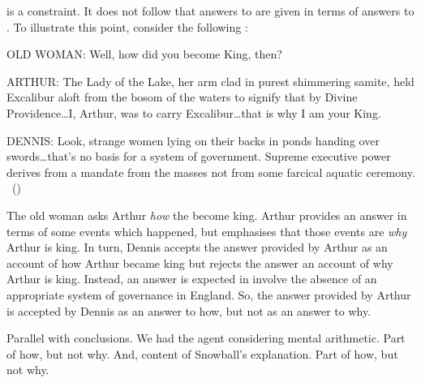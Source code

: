 \begin{note}
  \issueInclusion{} is a constraint.
  It does not follow that answers to \qWhy{} are given in terms of answers to \qHow{}.
  To illustrate this point, consider the following \scen{}:

  \begin{scenario}[England AD 932]
    \vspace{-\baselineskip}
    \begin{screenplay}
    \item[OLD WOMAN:]
      Well, how did you become King, then?
    \item[ARTHUR:]
      The Lady of the Lake, her arm clad in purest shimmering samite, held Excalibur aloft from the bosom of the waters to signify that by Divine Providence\space\dots\space I, Arthur, was to carry Excalibur\dots\space that is why I am your King.
    \item[DENNIS:]
      Look, strange women lying on their backs in ponds handing over swords\space\dots\space that's no basis for a system of government.
      Supreme executive power derives from a mandate from the masses not from some farcical aquatic ceremony.%
      \mbox{ }\hfill\mbox{(\cite[8--9]{Cleese:1974aa})}
    \end{screenplay}
    \vspace{-\baselineskip}
  \end{scenario}

  The old woman asks Arthur \emph{how} the become king.
  Arthur provides an answer in terms of some events which happened, but emphasises that those events are \emph{why} Arthur is king.
  In turn, Dennis accepts the answer provided by Arthur as an account of how Arthur became king but rejects the answer an account of why Arthur is king.
  Instead, an answer is expected in involve the absence of an appropriate system of governance in England.
  So, the answer provided by Arthur is accepted by Dennis as an answer to how, but not as an answer to why.
\end{note}

\begin{note}
  Parallel with conclusions.
  We had the agent considering mental arithmetic.
  Part of how, but not why.
  And, content of Snowball's explanation.
  Part of how, but not why.
\end{note}

